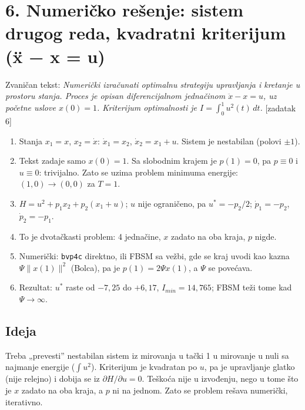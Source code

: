 \documentclass[11pt,a4paper,parskip=half,headsepline,numbers=noenddot]{scrartcl}
\DeclareRobustCommand{\izvor}[1]{{\small\color{izvorC}[#1]}}
\begin{document}
\section{6. Numeričko rešenje: sistem drugog reda, kvadratni kriterijum (ẍ − x = u)}

Zvaničan tekst: \emph{Numerički izračunati optimalnu strategiju upravljanja i kretanje u prostoru stanja. Proces je opisan diferencijalnom jednačinom \(\ddot x - x = u\), uz početne uslove \(x(0) = 1\). Kriterijum optimalnosti je \(I = \int_0^1 u^2(t)\,dt\).} \izvor{zadatak 6}

\begin{kljucna}
\begin{enumerate}
\def\labelenumi{\arabic{enumi}.}
\item Stanja \(x_1 = x\), \(x_2 = \dot x\): \(\dot x_1 = x_2\), \(\dot x_2 = x_1 + u\). Sistem je nestabilan (polovi \(\pm1\)).
\item Tekst zadaje samo \(x(0) = 1\). Sa slobodnim krajem je \(p(1) = 0\), pa \(p \equiv 0\) i \(u \equiv 0\): trivijalno. Zato se uzima problem minimuma energije: \((1, 0) \to (0, 0)\) za \(T = 1\).
\item \(H = u^2 + p_1x_2 + p_2(x_1 + u)\); \(u\) nije ograničeno, pa \(u^* = -p_2/2\); \(\dot p_1 = -p_2\), \(\dot p_2 = -p_1\).
\item To je dvotačkasti problem: 4 jednačine, \(x\) zadato na oba kraja, \(p\) nigde.
\item Numerički: \texttt{bvp4c} direktno, ili FBSM sa vežbi, gde se kraj uvodi kao kazna \(\Psi\|x(1)\|^2\) (Bolca), pa je \(p(1) = 2\Psi x(1)\), a \(\Psi\) se povećava.
\item Rezultat: \(u^*\) raste od \(-7{,}25\) do \(+6{,}17\), \(I_{min} = 14{,}765\); FBSM teži tome kad \(\Psi \to \infty\).
\end{enumerate}
\end{kljucna}

\subsection{Ideja}

Treba „prevesti'' nestabilan sistem iz mirovanja u tački 1 u mirovanje u nuli sa najmanje energije (\(\int u^2\)). Kriterijum je kvadratan po \(u\), pa je upravljanje glatko (nije relejno) i dobija se iz \(\partial H/\partial u = 0\). Teškoća nije u izvođenju, nego u tome što je \(x\) zadato na oba kraja, a \(p\) ni na jednom. Zato se problem rešava numerički, iterativno.
\end{document}
